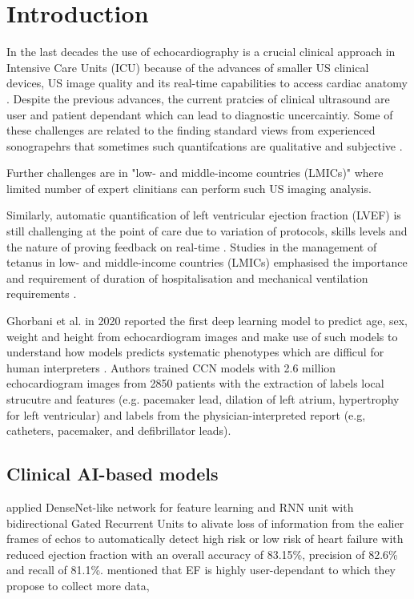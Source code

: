 \section{Introduction} \label{sec:intro}
In the last decades the use of echocardiography is a crucial clinical approach in Intensive Care Units (ICU) because of the advances of smaller US clinical devices, US image quality and its real-time capabilities to access cardiac anatomy \cite{Feigenbaum1996, Vieillard-Baron2008, singh2007, cambell2018}.
Despite the previous advances, the current pratcies of clinical ultrasound are user and patient dependant which can lead to diagnostic uncercaintiy.
Some of these challenges are related to the finding standard views from experienced sonograpehrs that sometimes such quantifcations are qualitative and subjective \cite{Feigenbaum1996}.

Further challenges are in "low- and middle-income countries (LMICs)" where limited number of expert clinitians can perform such US imaging analysis.

Similarly, automatic quantification of left ventricular ejection fraction (LVEF) is still challenging at the point of care due to variation of protocols, skills levels \cite{field2011} and the nature of proving feedback on real-time \cite{liu2021}.
Studies in the management of tetanus in low- and middle-income countries (LMICs) emphasised the importance and requirement of duration of hospitalisation and mechanical ventilation requirements \cite{hao2021-wellcome}.

Ghorbani et al. in 2020 reported the first deep learning model to predict age, sex, weight and height from echocardiogram images and make use of such models to understand how models predicts systematic phenotypes which are difficul for human interpreters \cite{Ghorbani-DigitalMedicineNature-JAN2020}.
Authors trained CCN models with 2.6 million echocardiogram images from 2850 patients with the extraction of labels local strucutre and features (e.g. pacemaker lead, dilation of left atrium, hypertrophy for left ventricular) and labels from the physician-interpreted report (e.g, catheters, pacemaker, and deﬁbrillator leads). 

\subsection{Clinical AI-based models}

\cite{behnami2020} applied DenseNet-like network for feature learning and RNN unit with bidirectional Gated Recurrent Units to alivate loss of information from the ealier frames of echos to automatically detect high risk or low risk of heart failure with reduced ejection fraction with an overall accuracy of 83.15\%, precision of 82.6\% and recall of 81.1\%.
\cite{behnami2020} mentioned that EF is highly user-dependant to which they propose to collect more data, 

